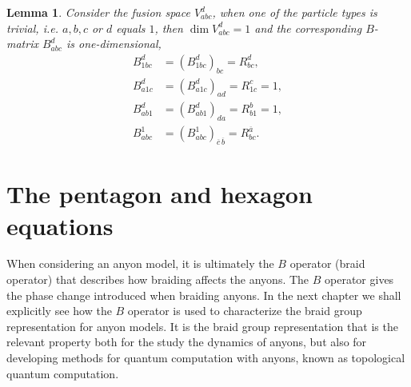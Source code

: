 \documentclass[a4paper,10pt,oneside]{book}
\theoremstyle{plain}
\newtheorem{lemma}[theorem]{Lemma}
\theoremstyle{definition}
\theoremstyle{remark}
\begin{document}
\begin{lemma}\label{res:B1}
  Consider the fusion space $V_{abc}^d$, when one of the particle types is trivial, i.e. $a,b,c$ or $d$ equals $1$, then $\dim V_{abc}^d = 1$ and the corresponding $B$-matrix $B_{abc}^d$ is one-dimensional,
  \begin{align*}
    B_{1bc}^d &= \left( B_{1bc}^d \right)_{bc} = R_{bc}^d, \\
    B_{a1c}^d &= \left( B_{a1c}^d \right)_{ad} = R_{1c}^c = 1, \\
    B_{ab1}^d &= \left( B_{ab1}^d \right)_{da} = R_{b1}^b = 1, \\
    B_{abc}^1 &= \left( B_{abc}^1 \right)_{\overline{c}\,\overline{b}} = R_{bc}^{\overline{a}}.
  \end{align*}
\end{lemma}















































\section{The pentagon and hexagon equations}\label{sec:pentagon hexagon}

When considering an anyon model, it is ultimately the $B$ operator (braid operator) that describes how braiding affects the anyons. The $B$ operator gives the phase change introduced when braiding anyons. In the next chapter we shall explicitly see how the $B$ operator is used to characterize the braid group representation for anyon models. It is the braid group representation that is the relevant property both for the study the dynamics of anyons, but also for developing methods for quantum computation with anyons, known as topological quantum computation.
\end{document}
